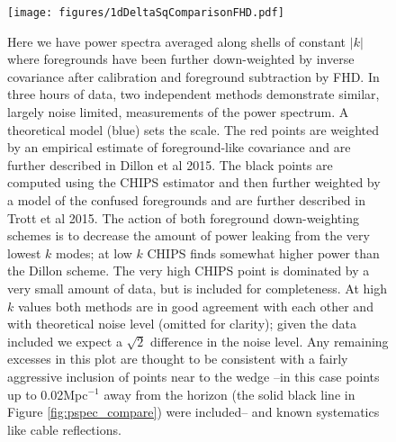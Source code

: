 \documentclass[preprint]{aastex}
\def\chipscite{Trott et al 2015}
\def\dilloncite{Dillon et al 2015}
\begin{document}
\begin{figure}[h!]
\begin{center}
\texttt{[image: figures/1dDeltaSqComparisonFHD.pdf]}
\caption{Here we have power spectra averaged along shells of constant $|k|$ where foregrounds have been further down-weighted by inverse covariance after calibration and foreground subtraction by FHD. In three hours of data, two independent methods demonstrate similar, largely noise limited, measurements of the power spectrum.  A theoretical model (blue) sets the scale.  The red points are weighted by an empirical estimate of foreground-like covariance and are further described in \dilloncite.  The black points are computed using the CHIPS estimator and then further weighted by a model of the confused foregrounds and are further described in \chipscite. The action of both foreground down-weighting schemes is to decrease the amount of power leaking from the very lowest $k$ modes; at low $k$ CHIPS finds somewhat higher power than the Dillon scheme.  The very high CHIPS point  is dominated by a very small amount of data, but is included for completeness.  At high $k$ values both methods are in good agreement with each other and with theoretical noise level (omitted for clarity); given the data included we expect a $\sqrt{2}$ difference in the noise level.  Any remaining excesses in this plot are thought to be consistent with a fairly aggressive inclusion of points near to the wedge --in this case points up to 0.02Mpc$^{-1}$ away from the horizon (the solid black line in Figure \ref{fig:pspec_compare}) were included-- and known systematics like cable reflections.\label{fig:1D_pspecs}}
\end{center}
\end{figure}
\end{document}

